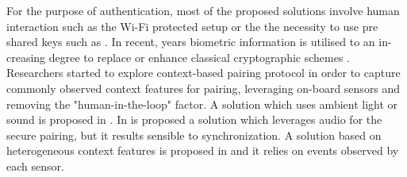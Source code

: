 For the purpose of authentication, most of the proposed solutions involve human interaction such as the Wi-Fi protected setup \cite{EldefrawyDynamicTimestamping} or the the necessity to use pre shared keys such as \cite{Gebremichael2019LightweightPad}. 
In recent, years biometric information is utilised to an in-creasing degree to replace or enhance classical cryptographic schemes \cite{Skoric2010SecurityData}.
Researchers started to explore context-based pairing protocol in order to capture commonly observed context features for pairing, leveraging on-board sensors and removing the "human-in-the-loop" factor.
A solution which uses ambient light or sound is proposed in \cite{Miettinen2014Context-BasedDescriptors}. 
In \cite{Schurmann2013SecureAudio} is proposed a solution which leverages audio for the secure pairing, but it results sensible to synchronization.
A solution based on heterogeneous context features is proposed in  \cite{Han2018DoTypes} and it relies on events observed by each sensor.